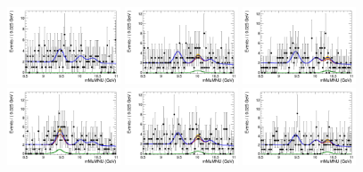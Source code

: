 \begin{figure}[!htbp]
\begin{center}
 \includegraphics[width=0.3\textwidth]{figures/modeling_xchecks/plots/HToUpsilon1SPhoton_Cat0_signalStrenght_100000/Cat0_mMuMNU_fit_s}
\includegraphics[width=0.3\textwidth]{figures/modeling_xchecks/plots/HToUpsilon2SPhoton_Cat0_signalStrenght_100000/Cat0_mMuMNU_fit_s}
\includegraphics[width=0.3\textwidth]{figures/modeling_xchecks/plots/HToUpsilon3SPhoton_Cat0_signalStrenght_100000/Cat0_mMuMNU_fit_s}
\includegraphics[width=0.3\textwidth]{figures/modeling_xchecks/plots/HToUpsilon1SPhoton_Cat0_signalStrenght_200000/Cat0_mMuMNU_fit_s}
\includegraphics[width=0.3\textwidth]{figures/modeling_xchecks/plots/HToUpsilon2SPhoton_Cat0_signalStrenght_200000/Cat0_mMuMNU_fit_s}
\includegraphics[width=0.3\textwidth]{figures/modeling_xchecks/plots/HToUpsilon3SPhoton_Cat0_signalStrenght_200000/Cat0_mMuMNU_fit_s}

\end{center}
\end{figure}
